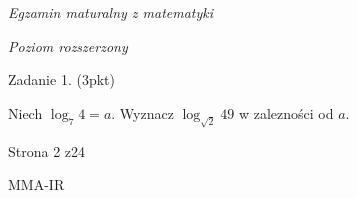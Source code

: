 \documentclass[a4paper,12pt]{article}
\begin{document}
{\it Egzamin maturalny z matematyki}

{\it Poziom rozszerzony}

Zadanie 1. (3pkt)

Niech $\log_{7}4=a$. Wyznacz $\log_{\sqrt{2}}49$ w zalezności od $a.$

Strona 2 z24

MMA-IR
\end{document}
